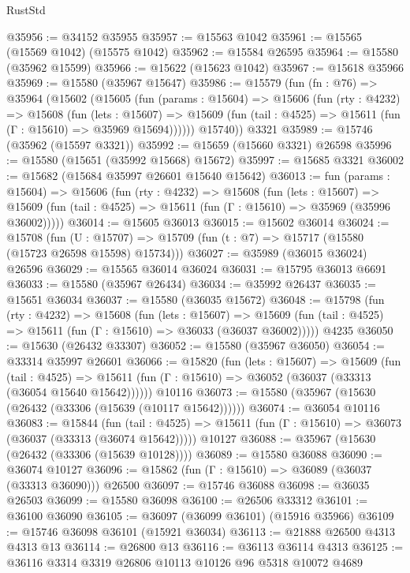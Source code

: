 \begin{lexlean}{RustStd}
\begin{coremodule}
@35956 := @34152 @35955
@35957 := @15563 @1042
@35961 := @15565 (@15569 @1042) (@15575 @1042)
@35962 := @15584 @26595
@35964 := @15580 (@35962 @15599)
@35966 := @15622 (@15623 @1042)
@35967 := @15618 @35966
@35969 := @15580 (@35967 @15647)
@35986 := @15579
    (fun (fn : @76) =>
    @35964
      (@15602
        (@15605
          (fun (params : @15604) =>
          @15606
            (fun (rty : @4232) =>
            @15608
              (fun (lets : @15607) =>
              @15609 (fun (tail : @4525) => @15611 (fun (Γ : @15610) => @35969 @15694))))))
        @15740))
    @3321
@35989 := @15746 (@35962 (@15597 @3321))
@35992 := @15659 (@15660 @3321) @26598
@35996 := @15580 (@15651 (@35992 @15668) @15672)
@35997 := @15685 @3321
@36002 := @15682 (@15684 @35997 @26601 @15640 @15642)
@36013 := fun (params : @15604) =>
  @15606
    (fun (rty : @4232) =>
    @15608
      (fun (lets : @15607) =>
      @15609 (fun (tail : @4525) => @15611 (fun (Γ : @15610) => @35969 (@35996 @36002)))))
@36014 := @15605 @36013
@36015 := @15602 @36014
@36024 := @15708
    (fun (U : @15707) => @15709 (fun (t : @7) => @15717 (@15580 (@15723 @26598 @15598) @15734)))
@36027 := @35989 (@36015 @36024) @26596
@36029 := @15565 @36014 @36024
@36031 := @15795 @36013 @6691
@36033 := @15580 (@35967 @26434)
@36034 := @35992 @26437
@36035 := @15651 @36034
@36037 := @15580 (@36035 @15672)
@36048 := @15798
    (fun (rty : @4232) =>
    @15608
      (fun (lets : @15607) =>
      @15609 (fun (tail : @4525) => @15611 (fun (Γ : @15610) => @36033 (@36037 @36002)))))
    @4235
@36050 := @15630 (@26432 @33307)
@36052 := @15580 (@35967 @36050)
@36054 := @33314 @35997 @26601
@36066 := @15820
    (fun (lets : @15607) =>
    @15609
      (fun (tail : @4525) =>
      @15611 (fun (Γ : @15610) => @36052 (@36037 (@33313 (@36054 @15640 @15642))))))
    @10116
@36073 := @15580 (@35967 (@15630 (@26432 (@33306 (@15639 (@10117 @15642))))))
@36074 := @36054 @10116
@36083 := @15844
    (fun (tail : @4525) => @15611 (fun (Γ : @15610) => @36073 (@36037 (@33313 (@36074 @15642)))))
    @10127
@36088 := @35967 (@15630 (@26432 (@33306 (@15639 @10128))))
@36089 := @15580 @36088
@36090 := @36074 @10127
@36096 := @15862 (fun (Γ : @15610) => @36089 (@36037 (@33313 @36090))) @26500
@36097 := @15746 @36088
@36098 := @36035 @26503
@36099 := @15580 @36098
@36100 := @26506 @33312
@36101 := @36100 @36090
@36105 := @36097 (@36099 @36101) (@15916 @35966)
@36109 := @15746 @36098 @36101 (@15921 @36034)
@36113 := @21888 @26500 @4313 @4313 @13
@36114 := @26800 @13
@36116 := @36113 @36114 @4313
@36125 := @36116 @3314 @3319 @26806 @10113 @10126 @96 @5318 @10072 @4689

\end{coremodule}
\end{lexlean}
